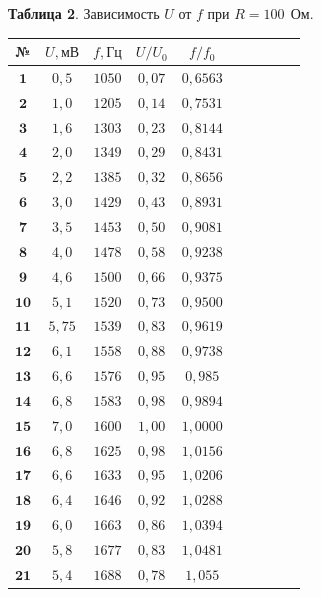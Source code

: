 \documentclass[11pt,a4paper]{article}
\begin{document}
\begin{table}[h!]
\begin{center}
		\textbf{Таблица 2}. Зависимость $U$ от $f$ при $R=100 \ \ \text{Ом}$.\\
		\begin{tabular}{|c|c|c|c|c|c|c|c|c|c|}
			\hline
№ & $U,\text{мВ}$ & $f,\text{Гц}$ &$U/U_0$ &$f/f_0$ \\ \hline
$\textbf{1}$ & $	0,5	$	&	$	1050	$	&	$0,07	$	&	$	0,6563	$	\\ \hline
$\textbf{2}$ & $	1,0	$	&	$	1205	$	&	$0,14	$	&	$	0,7531	$	\\ \hline
$\textbf{3}$ & $	1,6	$	&	$	1303	$	&	$0,23	$	&	$	0,8144	$	\\ \hline
$\textbf{4}$ & $	2,0	$	&	$	1349	$	&	$0,29	$	&	$	0,8431	$	\\ \hline
$\textbf{5}$ & $	2,2	$	&	$	1385	$	&	$0,32	$	&	$	0,8656	$	\\ \hline
$\textbf{6}$ & $	3,0	$	&	$	1429	$	&	$0,43	$	&	$	0,8931	$	\\ \hline
$\textbf{7}$ & $	3,5	$	&	$	1453	$	&	$0,50	$	&	$	0,9081	$	\\ \hline
$\textbf{8}$ & $	4,0	$	&	$	1478	$	&$	0,58	$	&	$	0,9238	$	\\ \hline
$\textbf{9}$ & $	4,6	$	&	$	1500	$	&	$0,66	$	&	$	0,9375	$	\\ \hline
$\textbf{10}$ & $	5,1	$	&	$	1520	$	&	$0,73	$	&	$	0,9500	$	\\ \hline
$\textbf{11}$ & $	5,75	$	&	$	1539	$	& $	0,83	$	&	$	0,9619	$	\\ \hline
$\textbf{12}$ & $	6,1	$	&	$	1558	$	&	$0,88	$	&	$	0,9738	$	\\ \hline
$\textbf{13}$ & $	6,6	$	&	$	1576	$	&	$0,95	$	&	$	0,985	$	\\ \hline
$\textbf{14}$ & $	6,8	$	&	$	1583	$	&	$0,98	$	&	$	0,9894	$	\\ \hline
$\textbf{15}$ & $	7,0	$	&	$	1600	$	&$	1,00	$	&	$	1,0000	$	\\ \hline
$\textbf{16}$ & $	6,8	$	&	$	1625	$	&	$0,98	$	&	$	1,0156	$	\\ \hline
$\textbf{17}$ & $	6,6	$	&	$	1633	$	&	$0,95	$	&	$	1,0206	$	\\ \hline
$\textbf{18}$ & $	6,4	$	&	$	1646	$	&	$0,92	$	&	$	1,0288	$	\\ \hline
$\textbf{19}$ & $	6,0	$	&	$	1663	$	&	$0,86	$	&	$	1,0394	$	\\ \hline
$\textbf{20}$ & $	5,8	$	&	$	1677	$	&	$0,83	$	&	$	1,0481	$	\\ \hline
$\textbf{21}$ & $	5,4	$	&	$	1688	$	&	$0,78	$	&	$	1,055	$	\\ \hline

\end{tabular}
\end{center}
\end{table}
\end{document}
